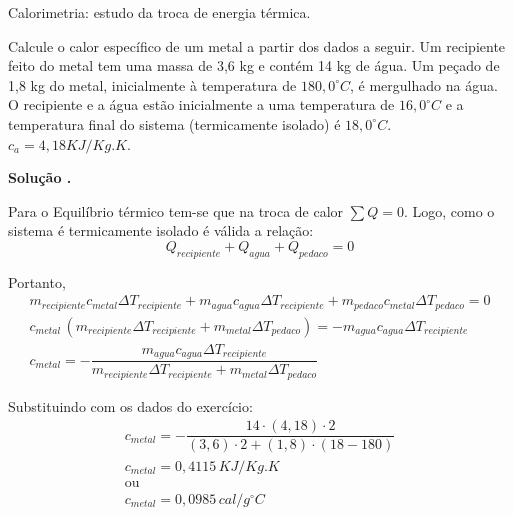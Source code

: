 \documentclass[a4paper, 12pt]{article}
\newenvironment{question}[2][Questão]{\begin{trivlist}
\item[\hskip \labelsep {\bfseries #1}\hskip \labelsep {\bfseries #2.}]}{\end{trivlist}}
\newenvironment{solving}[1][\unskip]{%
\vspace{0.2cm}

\noindent\textbf{ Solução #1.}
\vspace{0.1cm}

}
{}
\begin{document}
\newcommand{\thedepartment}{Faculdade de Engenharia Elétrica}
\newcommand{\thecourse}{FEELT}
\newcommand{\thetitle}{Temperatura, calor e primeira lei da termodinâmica}
\newcommand{\thetype}{Trabalho Extra da Disciplina de Física III}
\newcommand{\theproftitle}{Bacharel em Física}
\newcommand{\thestudent}{Lesly Viviane Montúfar Berrios\\
\centering11811ETE001}
\newcommand{\theadvisor}{Prof. Silésia Curcino}
\newcommand{\thecity}{Uberlândia}

\thispagestyle{empty} 

\begin{question}{1}  Calorimetria: estudo da troca de energia térmica.

Calcule o calor específico de um metal a partir dos dados a seguir. Um recipiente feito do metal tem uma massa de 3,6 kg e contém 14 kg de água. Um peçado de 1,8 kg do metal, inicialmente à temperatura de $180,0^{\circ}C$, é mergulhado na água. O recipiente e a água estão inicialmente a uma temperatura de  $16,0^{\circ}C$ e a temperatura final do sistema (termicamente isolado) é  $18,0^{\circ}C$. $c_a=4,18KJ/Kg.K$.

\end{question}

\begin{solving}
Para o Equilíbrio térmico tem-se que na troca de calor $\sum Q = 0$. Logo, como o sistema é termicamente isolado é válida a relação:
$$Q_{recipiente} + Q_{agua}+Q_{pedaco}=0$$

Portanto, 
\begin{gather*}
m_{recipiente} c_{metal}\Delta T_{recipiente} + m_{agua} c_{agua}\Delta T_{recipiente} + m_{pedaco} c_{metal}\Delta T_{pedaco} = 0\\
 c_{metal}\, (m_{recipiente}\Delta T_{recipiente}+ m_{metal} \Delta T_{pedaco}) = -m_{agua} c_{agua}\Delta T_{recipiente}\\
 c_{metal} = -\dfrac{m_{agua} c_{agua}\Delta T_{recipiente}}{m_{recipiente}\Delta T_{recipiente}+ m_{metal} \Delta T_{pedaco}}
\end{gather*}

Substituindo com os dados do exercício:
\begin{gather*}
c_{metal} = -\dfrac{14\cdot (4,18)\cdot 2}{(3,6)\cdot 2+ (1,8)\cdot (18-180)}\\
c_{metal} = 0,4115\, KJ/Kg.K\\
\text{ou}\\
c_{metal} = 0,0985\, cal/g^{\circ}C
\end{gather*}

\end{solving}
\end{document}
